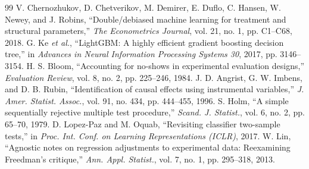 \documentclass[conference]{IEEEtran}
\begin{document}
\begin{thebibliography}{99}
 V. Chernozhukov, D. Chetverikov, M. Demirer, E. Duflo, C. Hansen, W. Newey, and J. Robins, ``Double/debiased machine learning for treatment and structural parameters,'' \emph{The Econometrics Journal}, vol. 21, no. 1, pp. C1--C68, 2018.
 G. Ke \emph{et al.}, ``LightGBM: A highly efficient gradient boosting decision tree,'' in \emph{Advances in Neural Information Processing Systems 30}, 2017, pp. 3146--3154.
 H. S. Bloom, ``Accounting for no-shows in experimental evaluation designs,'' \emph{Evaluation Review}, vol. 8, no. 2, pp. 225--246, 1984.
 J. D. Angrist, G. W. Imbens, and D. B. Rubin, ``Identification of causal effects using instrumental variables,'' \emph{J. Amer. Statist. Assoc.}, vol. 91, no. 434, pp. 444--455, 1996.
 S. Holm, ``A simple sequentially rejective multiple test procedure,'' \emph{Scand. J. Statist.}, vol. 6, no. 2, pp. 65--70, 1979.
 D. Lopez-Paz and M. Oquab, ``Revisiting classifier two-sample tests,'' in \emph{Proc. Int. Conf. on Learning Representations (ICLR)}, 2017.
 W. Lin, ``Agnostic notes on regression adjustments to experimental data: Reexamining Freedman's critique,'' \emph{Ann. Appl. Statist.}, vol. 7, no. 1, pp. 295--318, 2013.
\end{thebibliography}
\end{document}
